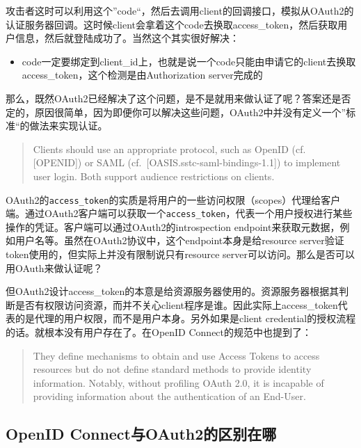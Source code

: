\documentclass[12pt]{article}
\begin{document}
攻击者这时可以利用这个''code``，然后去调用client的回调接口，模拟从OAuth2的认证服务器回调。这时候client会拿着这个code去换取access\_token，然后获取用户信息，然后就登陆成功了。当然这个其实很好解决：

\begin{itemize}
\tightlist
\item
  code一定要绑定到client\_id上，也就是说一个code只能由申请它的client去换取access\_token，这个检测是由Authorization server完成的
\end{itemize}

那么，既然OAuth2已经解决了这个问题，是不是就用来做认证了呢？答案还是否定的，原因很简单，因为即便你可以解决这些问题，OAuth2中并没有定义一个''标准``的做法来实现认证。

\begin{quote}
Clients should use an appropriate protocol, such as OpenID (cf. {[}OPENID{]}) or SAML (cf.~{[}OASIS.sstc-saml-bindings-1.1{]}) to implement user login. Both support audience restrictions on clients.
\end{quote}

OAuth2的\texttt{access\_token}的实质是将用户的一些访问权限（scopes）代理给客户端。通过OAuth2客户端可以获取一个\texttt{access\_token}，代表一个用户授权进行某些操作的凭证。客户端可以通过OAuth2的introspection endpoint来获取元数据，例如用户名等。虽然在OAuth2协议中，这个endpoint本身是给resource server验证token使用的，但实际上并没有限制说只有resource server可以访问。那么是否可以用OAuth来做认证呢？

但OAuth2设计access\_token的本意是给资源服务器使用的。资源服务器根据其判断是否有权限访问资源，而并不关心client程序是谁。因此实际上access\_token代表的是代理的用户权限，而不是用户本身。另外如果是client credential的授权流程的话。就根本没有用户存在了。在OpenID Connect的规范中也提到了：

\begin{quote}
They define mechanisms to obtain and use Access Tokens to access resources but do not define standard methods to provide identity information. Notably, without profiling OAuth 2.0, it is incapable of providing information about the authentication of an End-User.
\end{quote}

\subsection{OpenID Connect与OAuth2的区别在哪}\label{openid-connectux4e0eoauth2ux7684ux533aux522bux5728ux54ea}
\end{document}
